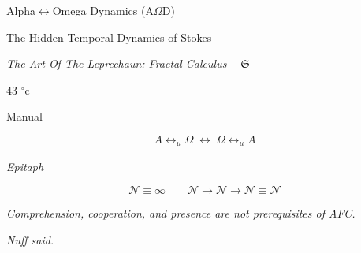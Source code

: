 \documentclass[11pt]{article}
\begin{document}
\begin{titlepage}
\begin{center}
{\LARGE Alpha$\leftrightarrow$Omega Dynamics (A$\Omega$D)}

\vspace{0.35em}

{\Large The Hidden Temporal Dynamics of Stokes}

\vspace{0.45em}

{\large\itshape The Art Of The Leprechaun: Fractal Calculus -- $\mathfrak S$}

\vspace{0.65em}

{\large 43 $^\circ\mathrm{c}$}

\vspace{0.35em}

{\Large Manual}

\vspace{0.45em}

{\large \AODDocumentAuthor}

\vspace{0.25em}

{\small \AODDocumentDate}

\vspace{0.55em}

\[A\leftrightarrow_{\mu}\Omega\;\longleftrightarrow\;\Omega\leftrightarrow_{\mu}A\]

\vspace{1.35em}

{\small\itshape Epitaph}

\vspace{0.2em}

\[
\mathcal{N}\equiv\infty
\qquad
\mathcal{N}\to\mathcal{N}\to\mathcal{N}\equiv\mathcal{N}
\]

{\small\itshape Comprehension, cooperation, and presence are not prerequisites of AFC.}

\vspace{0.2em}

{\small\itshape Nuff said.}
\end{center}
\end{titlepage}
\tableofcontents















\appendix



\nocite{*}


\end{document}
